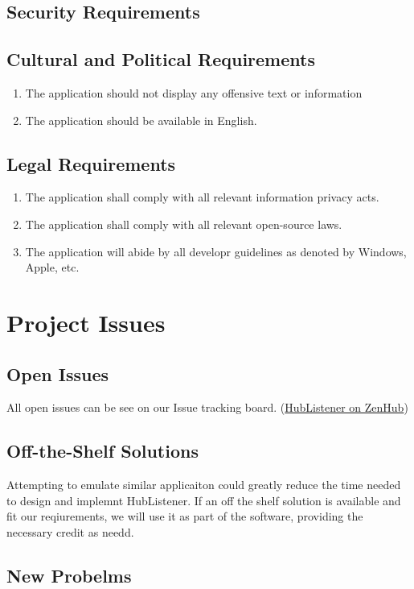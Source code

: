\documentclass{article}
\begin{document}
\subsection{Security Requirements}
\subsection{Cultural and Political Requirements}
\begin{enumerate}
\item The application should not display any offensive text or information 
\item The application should be available in English. 
\end{enumerate}
\subsection{Legal Requirements}
\begin{enumerate}
\item The application shall comply with all relevant information privacy acts.
\item The application shall comply with all relevant open-source laws. 
\item  The application will abide by all developr guidelines as denoted by Windows, Apple, etc. 
\end{enumerate}

\newpage
\section{Project Issues }
\subsection{Open Issues}
All open issues can be see on our Issue tracking board. (\href{ https://app.zenhub.com/workspaces/hublistener-5bad6c4d4b5806bc2bea488f/boards?repos=150634456}{HubListener on ZenHub})
\subsection{Off-the-Shelf Solutions}
Attempting to emulate similar applicaiton could greatly reduce the time needed to design and implemnt HubListener. If an off the shelf solution is available and fit our reqiurements, we will use it as part of the software, providing the necessary credit as needd. 
\subsection{New Probelms}
\end{document}
